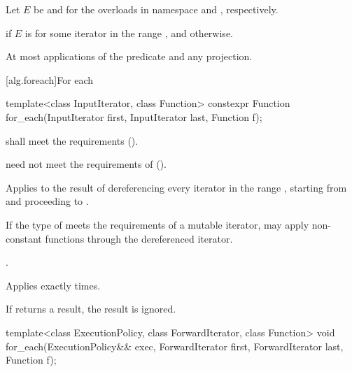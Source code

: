 \begin{itemdescr}
\pnum
Let $E$ be  and 
for the overloads in namespace  and , respectively.

\pnum
\returns
{} if $E$ is 
for some iterator  in the range , and
 otherwise.

\pnum
\complexity
At most  applications of the predicate and any projection.
\end{itemdescr}

[alg.foreach]{For each}

%
\begin{itemdecl}
template<class InputIterator, class Function>
  constexpr Function for_each(InputIterator first, InputIterator last, Function f);
\end{itemdecl}

\begin{itemdescr}
\pnum
\requires
{} shall meet
the  requirements ().
\begin{note}
 need not meet the requirements of
 ().
\end{note}

\pnum
\effects
Applies  to the result of dereferencing
every iterator in the range ,
starting from  and proceeding to .
\begin{note}
If the type of  meets the requirements of a mutable iterator,
 may apply non-constant functions through the dereferenced iterator.
\end{note}

\pnum
\returns
{}.

\pnum
\complexity
Applies  exactly  times.

\pnum
\remarks
If  returns a result, the result is ignored.
\end{itemdescr}

%
\begin{itemdecl}
template<class ExecutionPolicy, class ForwardIterator, class Function>
  void for_each(ExecutionPolicy&& exec,
                ForwardIterator first, ForwardIterator last,
                Function f);
\end{itemdecl}

